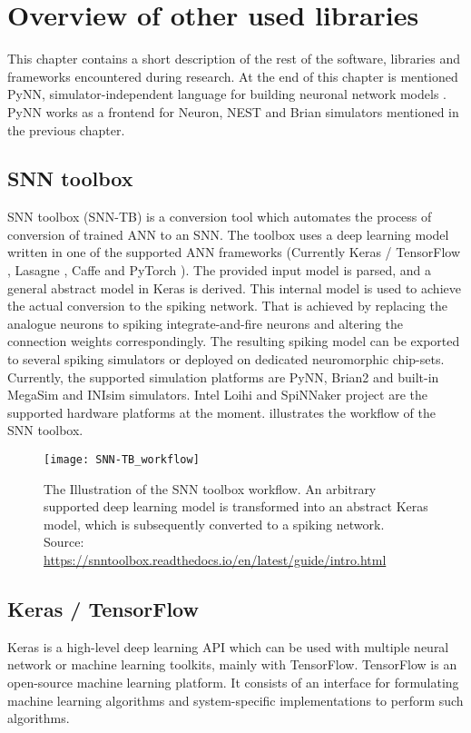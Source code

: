 \chapter{Overview of other used libraries} \label{chap:04}

This chapter contains a short description of the rest of the software, libraries and frameworks encountered during research. At the end of this chapter is mentioned PyNN, simulator-independent language for building neuronal network models \cite{davisonPyNNCommonInterface2009}. PyNN works as a frontend for Neuron, NEST and Brian simulators mentioned in the previous chapter.

\section{SNN toolbox}
SNN toolbox (SNN-TB) \cite{rueckauerConversionContinuousValuedDeep2017} is a conversion tool which automates the process of conversion of trained ANN to an SNN. The toolbox uses a deep learning model written in one of the supported ANN frameworks (Currently Keras / TensorFlow \cite{cholletKeras15}, Lasagne \cite{sanderdielemanLasagneFirst15}, Caffe \cite{jiaCaffeConvolutional14} and PyTorch \cite{paszkePyTorchImperative19}). The provided input model is parsed, and a general abstract model in Keras is derived. This internal model is used to achieve the actual conversion to the spiking network. That is achieved by replacing the analogue neurons to spiking integrate-and-fire neurons and altering the connection weights correspondingly. The resulting spiking model can be exported to several spiking simulators or deployed on dedicated neuromorphic chip-sets. Currently, the supported simulation platforms are PyNN, Brian2 and built-in MegaSim and INIsim simulators. Intel Loihi and SpiNNaker project are the supported hardware platforms at the moment.  illustrates the workflow of the SNN toolbox.

\begin{figure}[htbp]
    \centering
    \texttt{[image: SNN-TB\_workflow]}
    \caption{The Illustration of the SNN toolbox workflow. An arbitrary supported deep learning model is transformed into an abstract Keras model, which is subsequently converted to a spiking network. Source: \url{https://snntoolbox.readthedocs.io/en/latest/guide/intro.html}}
    \label{fig:snn-tb_workflow}
\end{figure}

\section{Keras / TensorFlow}
Keras is a high-level deep learning API which can be used with multiple neural network or machine learning toolkits, mainly with TensorFlow. TensorFlow is an open-source machine learning platform. It consists of an interface for formulating machine learning algorithms and system-specific implementations to perform such algorithms.

